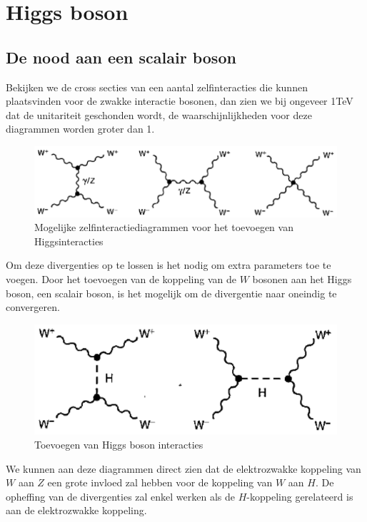 \documentclass[../main.tex]{subfiles}
\begin{document}
\section{Higgs boson}%
\label{sec:higgs_boson}

\subsection{De nood aan een scalair boson}%
\label{sub:de_noot_voor_een_scalair_boson}

Bekijken we de cross secties van een aantal zelfinteracties die kunnen plaatsvinden voor de zwakke interactie bosonen, dan zien we bij ongeveer 1TeV dat de unitariteit geschonden wordt, de waarschijnlijkheden voor deze diagrammen worden groter dan 1.

\begin{figure}[h]
    \centering
    \includegraphics[width=0.8\linewidth]{higgs_boson/zwak_zelf_int_geen_H.png}
    \caption{Mogelijke zelfinteractiediagrammen voor het toevoegen van Higgsinteracties}%
    \label{fig:higgs_boson/zwak_zelf_int_geen_H}
\end{figure}

Om deze divergenties op te lossen is het nodig om extra parameters toe te voegen. Door het toevoegen van de koppeling van de $W$ bosonen aan het Higgs boson, een scalair boson, is het mogelijk om de divergentie naar oneindig te convergeren.

\begin{figure}[h]
    \centering
    \includegraphics[width=0.6\linewidth]{higgs_boson/zwak_zelf_int_H.png}
    \caption{Toevoegen van Higgs boson interacties}%
    \label{fig:higgs_boson/zwak_zelf_int_H}
\end{figure}

We kunnen aan deze diagrammen direct zien dat de elektrozwakke koppeling van $W$ aan $Z$ een grote invloed zal hebben voor de koppeling van $W$ aan $H$. De opheffing van de divergenties zal enkel werken als de $H$-koppeling gerelateerd is aan de elektrozwakke koppeling.
\end{document}
